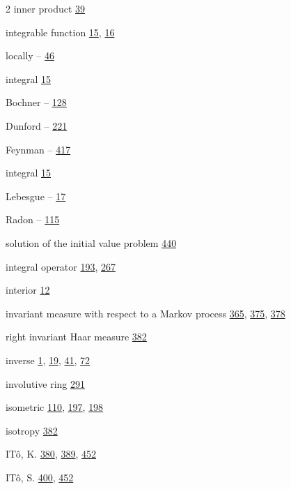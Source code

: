 \begin{multicols}{2}
\noindent inner product \hyperlink{page.39}{39}\par
\noindent integrable function \hyperlink{page.15}{15}, \hyperlink{page.16}{16}\par
\hspace*{1.1em}locally -- \hyperlink{page.46}{46}\par
\noindent integral \hyperlink{page.15}{15}\par
\hspace*{1.1em}Bochner -- \hyperlink{page.128}{128}\par
\hspace*{1.1em}Dunford -- \hyperlink{page.221}{221}\par
\hspace*{1.1em}Feynman -- \hyperlink{page.417}{417}\par
\noindent integral \hyperlink{page.15}{15}\par
\hspace*{1.1em}Lebesgue -- \hyperlink{page.17}{17}\par
\hspace*{1.1em}Radon -- \hyperlink{page.115}{115}\par
\hspace*{1.1em}solution of the initial value problem \hyperlink{page.440}{440}\par
\noindent integral operator \hyperlink{page.193}{193}, \hyperlink{page.267}{267}\par
\noindent interior \hyperlink{page.12}{12}\par
\noindent invariant measure with respect to a Markov process \hyperlink{page.365}{365}, \hyperlink{page.375}{375}, \hyperlink{page.378}{378}\par
\hspace*{1.1em}right invariant Haar measure \hyperlink{page.382}{382}\par
\noindent inverse \hyperlink{page.1}{1}, \hyperlink{page.19}{19}, \hyperlink{page.41}{41}, \hyperlink{page.72}{72}\par
\noindent involutive ring \hyperlink{page.291}{291}\par
\noindent isometric \hyperlink{page.110}{110}, \hyperlink{page.197}{197}, \hyperlink{page.198}{198}\par
\noindent isotropy \hyperlink{page.382}{382}\par
\noindent ITô, K. \hyperlink{page.380}{380}, \hyperlink{page.389}{389}, \hyperlink{page.452}{452}\par
\noindent ITô, S. \hyperlink{page.400}{400}, \hyperlink{page.452}{452}\par

\end{multicols}

